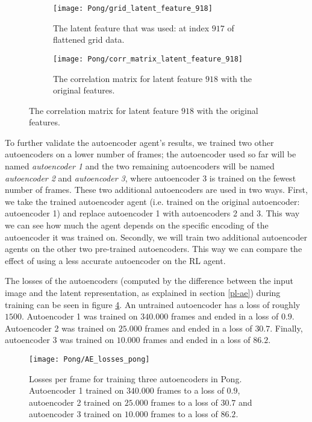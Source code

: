 \begin{figure}[h]
	\centering
	\begin{subfigure}[b]{0.2\textwidth}
		\texttt{[image: Pong/grid\_latent\_feature\_918]}
		\caption{The latent feature that was used: at index $917$ of flattened grid data.}
		\label{fig:ae-latent-feature-pong2} 
	\end{subfigure}\hfill
	\begin{subfigure}[b]{0.75\textwidth}
		\texttt{[image: Pong/corr\_matrix\_latent\_feature\_918]}
		\caption{The correlation matrix for latent feature $918$ with the original features.}
		\label{fig:ae-latent-feature-corr-matrix-pong2}
	\end{subfigure}
	\caption{The correlation matrix for latent feature $918$ with the original features.}
	\label{fig:latent-feature-corr-pong2}
\end{figure}

To further validate the autoencoder agent's results, we trained two other autoencoders on a lower number of frames; the autoencoder used so far will be named \emph{autoencoder 1} and the two remaining autoencoders will be named \emph{autoencoder 2} and \emph{autoencoder 3}, where autoencoder 3 is trained on the fewest number of frames. These two additional autoencoders are used in two ways. First, we take the trained autoencoder agent (i.e. trained on the original autoencoder: autoencoder 1) and replace autoencoder 1 with autoencoders 2 and 3. This way we can see how much the agent depends on the specific encoding of the autoencoder it was trained on. Secondly, we will train two additional autoencoder agents on the other two pre-trained autoencoders. This way we can compare the effect of using a less accurate autoencoder on the RL agent.

The losses of the autoencoders (computed by the difference between the input image and the latent representation, as explained in section \ref{pl-ae}) during training can be seen in figure \ref{fig:ae-loss-pong}. An untrained autoencoder has a loss of roughly $1500$. Autoencoder 1 was trained on $340.000$ frames and ended in a loss of $0.9$. Autoencoder 2 was trained on $25.000$ frames and ended in a loss of $30.7$. Finally, autoencoder 3 was trained on $10.000$ frames and ended in a loss of $86.2$.

\begin{figure}[h]
    \centering
   	\texttt{[image: Pong/AE\_losses\_pong]}
    	\caption{Losses per frame for training three autoencoders in Pong. Autoencoder 1 trained on $340.000$ frames to a loss of $0.9$, autoencoder 2 trained on $25.000$ frames to a loss of $30.7$ and autoencoder 3 trained on $10.000$ frames to a loss of $86.2$.}
    	\label{fig:ae-loss-pong}
\end{figure}

